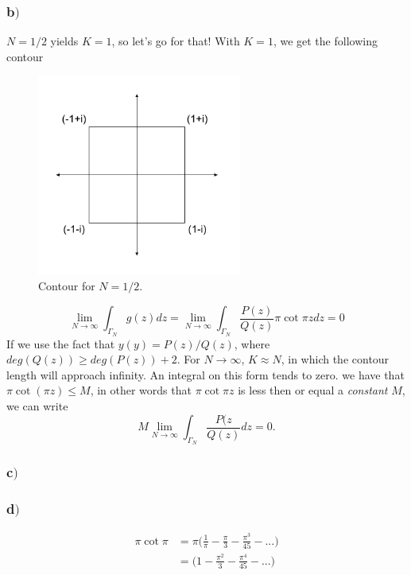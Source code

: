 \documentclass{article}
\begin{document}
\subsubsection*{b$)$}
$N = 1/2$ yields $K = 1$, so let's go for that! With $K = 1$, we get the following contour
\begin{figure}[H]
\centering
\includegraphics[width=0.6\textwidth]{complex_contour}
\caption{Contour for $N=1/2$.}
\label{fig:figure_label}
\end{figure}
\begin{equation}
\lim_{N\to\infty}\int_{\Gamma_N}g(z)dz = \lim_{N\to\infty}\int_{\Gamma_N}\frac{P(z)}{Q(z)}\pi\cot{\pi z}dz = 0
\end{equation}
If we use the fact that $y(y) = P(z)/Q(z)$, where $deg(Q(z))\geq deg(P(z))+2$. For $N\to\infty$, $K\approx N$, in which the contour length will approach infinity. An integral on this form tends to zero. we have that $\pi\cot{(\pi z)}\leq M$, in other words that $\pi\cot{\pi z}$ is less then or equal a \textit{constant} $M$, we can write
\begin{equation}
M\lim_{N\to\infty}\int_{\Gamma_N}\frac{P(z}{Q(z)}dz = 0.
\end{equation}

\subsubsection*{c$)$}

\subsubsection*{d$)$}

\begin{align}
\pi\cot{\pi} &=\pi\bigg(\frac{1}{\pi} - \frac{\pi}{3} -\frac{\pi^3}{45} - ...\bigg)\\
 &=\bigg(1 - \frac{\pi^2}{3} -\frac{\pi^4}{45} - ...\bigg)\\
\end{align}
\end{document}
